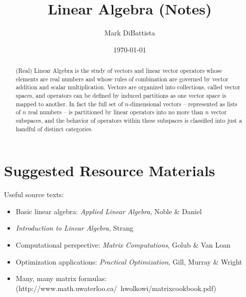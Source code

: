 \documentclass[12pt, twoside, draft]{article}
\begin{document}
\setpagewiselinenumbers


\title{Linear Algebra (Notes)}

\footnotesize\date{\today}

\author{Mark DiBattista}

\maketitle

\begin{abstract}
(Real) Linear Algebra is the study of vectors and linear vector operators whose elements are real numbers and whose rules of combination are governed by vector addition and scalar multiplication.  Vectors are organized into collections, called  vector spaces, and operators can be defined by induced partitions as one vector space  is mapped to another.  In fact the full set of $n$-dimensional vectors -- represented as lists of $n$ real numbers -- is partitioned by linear operators into no more than $n$ vector subspaces, and the behavior of operators within these subspaces is classified into just a handful of distinct categories. 

\end{abstract}


\section{Suggested Resource Materials}
Useful source texts:

\begin{itemize}[noitemsep]
\item Basic linear algebra:\hspace{50pt} \textit{Applied Linear Algebra}, Noble \& Daniel
\item[] \hspace{140pt} \textit{Introduction to Linear Algebra}, Strang
\item Computational perspective: \hspace{13pt} \textit{Matrix Computations}, Golub \& Van Loan
\item Optimization applications: \hspace{18pt} \textit{Practical Optimization}, Gill, Murray \& Wright
\item Many, many matrix formulas: (http://www.math.uwaterloo.ca/~hwolkowi/matrixcookbook.pdf)
\end{itemize}
\end{document}
